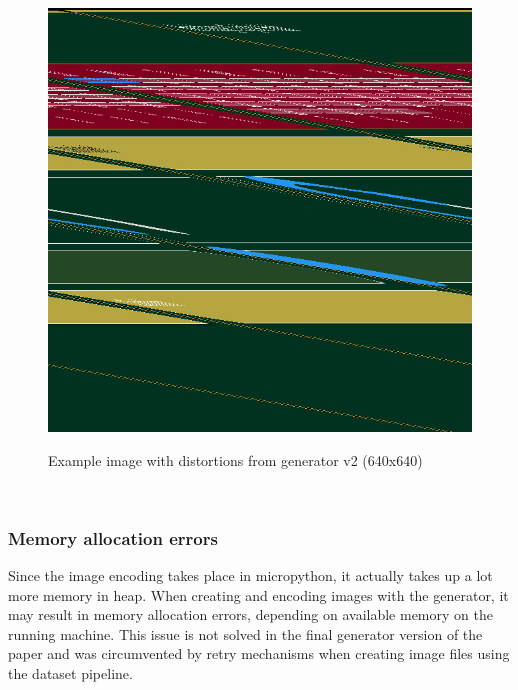 \documentclass[Bachelor, BIC, english, fhCitStyle, IEEE]{BASE/twbook} %
\newcommand{\nocontentsline}[3]{}
\newcommand{\hidsubsubsection}[1]{\bgroup\let\addcontentsline=\nocontentsline\subsubsection{#1}\egroup}
\begin{document}
\begin{figure}
    \caption{Example image with distortions from generator v2 (640x640)}
    \centering
    \includegraphics[height=0.4\textheight]{distorted_image_example.jpg}
    \label{fig:genv2distortedexample}
\end{figure}\\
\hidsubsubsection{Memory allocation errors}
Since the image encoding takes place in micropython, it actually takes up a lot more memory in heap. When creating and encoding images with the generator, it may result in memory allocation errors, depending on available memory on the running machine. This issue is not solved in the final generator version of the paper and was circumvented by retry mechanisms when creating image files using the dataset pipeline.
\newpage
\end{document}

